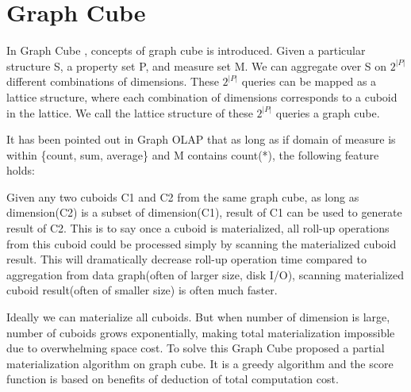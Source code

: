 \section{Graph Cube}

In Graph Cube \cite{DBLP:conf/sigmod/ZhaoLXH11}, concepts of graph cube is introduced. Given a particular structure S, a property set P, and measure set M. We can aggregate over S on $2^{|P|}$ different combinations of dimensions. These $2^{|P|}$ queries can be mapped as a lattice structure, where each combination of dimensions corresponds to a cuboid in the lattice. We call the lattice structure of these $2^{|P|}$ queries a graph cube.


It has been pointed out in  Graph OLAP \cite{DBLP:conf/icdm/ChenYZHY08} that as long as if domain of measure is within \{count, sum, average\} and M contains count(*), the following feature holds:
 
Given any two cuboids C1 and C2 from the same graph cube, as long as dimension(C2) is a subset of dimension(C1), result of C1 can be used to generate result of C2. This is to say once a cuboid is materialized, all roll-up operations from this cuboid could be processed simply by scanning the materialized cuboid result. This will dramatically decrease roll-up operation time compared to aggregation from data graph(often of larger size, disk I/O), scanning materialized cuboid result(often of smaller size) is often much faster.


 
Ideally we can materialize all cuboids. But when number of dimension is large, number of cuboids grows exponentially, making total materialization impossible due to overwhelming space cost. To solve this Graph Cube \cite{DBLP:conf/sigmod/ZhaoLXH11} proposed a partial materialization algorithm on graph cube. It is a greedy algorithm and the score function is based on benefits of deduction of total computation cost.
